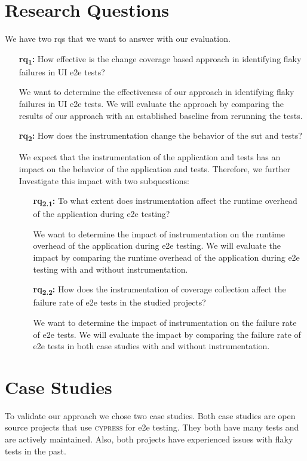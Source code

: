 \section{Research Questions}
We have two \acp{rq} that we want to answer with our evaluation.
\begin{enumerate}
	\item[\textbf{\acs{rq}\textsubscript{1}:}] How effective is the change coverage based approach in identifying flaky failures in UI \ac{e2e} tests?

		We want to determine the effectiveness of our approach in identifying flaky failures in UI \ac{e2e} tests.
		We will evaluate the approach by comparing the results of our approach with an established baseline from rerunning the tests.
	\item[\textbf{\acs{rq}\textsubscript{2}:}] How does the instrumentation change the behavior of the \ac{sut} and tests?

		We expect that the instrumentation of the application and tests has an impact on the behavior of the application and tests.
		Therefore, we further Investigate this impact with two subquestions:
		\begin{enumerate}
			\item[\textbf{\acs{rq}\textsubscript{2.1}:}] To what extent does instrumentation affect the runtime overhead of the application during \acs{e2e} testing?

				We want to determine the impact of instrumentation on the runtime overhead of the application during \ac{e2e} testing.
				We will evaluate the impact by comparing the runtime overhead of the application during \ac{e2e} testing with and without instrumentation.
			\item[\textbf{\acs{rq}\textsubscript{2.2}:}] How does the instrumentation of coverage collection affect the failure rate of \ac{e2e} tests in the studied projects?

				We want to determine the impact of instrumentation on the failure rate of \ac{e2e} tests.
				We will evaluate the impact by comparing the failure rate of \ac{e2e} tests in both case studies with and without instrumentation.
		\end{enumerate}
\end{enumerate}

\section{Case Studies}
To validate our approach we chose two case studies.
Both case studies are open source projects that use \textsc{cypress} for \ac{e2e} testing.
They both have many tests and are actively maintained.
Also, both projects have experienced issues with flaky tests in the past.


